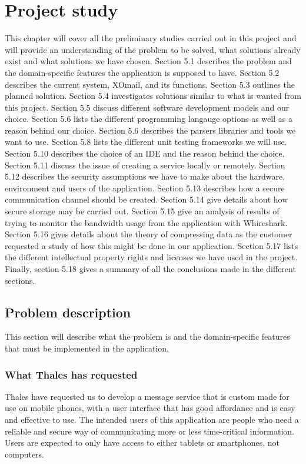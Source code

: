 \chapter{Project study}

This chapter will cover all the preliminary studies carried out in this project and will provide an understanding of the problem to be solved, what solutions already exist and what solutions we have chosen. Section 5.1 describes the problem and the domain-specific features the application is supposed to have. Section 5.2 describes the current system, XOmail, and its functions. Section 5.3 outlines the planned solution. Section 5.4 investigates solutions similar to what is wanted from this project. Section 5.5 discuss different software development models and our choice. Section 5.6 lists the different programming langauge options as well as a reason behind our choice. Section 5.6 describes the parsers libraries and tools we want to use. Section 5.8 lists the different unit testing frameworks we will use. Section 5.10 describes the choice of an IDE and the reason behind the choice. Section 5.11 discuss the issue of creating a service locally or remotely. Section 5.12 describes the security assumptions we have to make about the hardware, environment and users of the application. Section 5.13 describes how a secure communication channel should be created. Section 5.14 give details about how secure storage may be carried out. Section 5.15 give an analysis of results of trying to monitor the bandwidth usage from the application with Whireshark. Section 5.16 gives details about the theory of compressing data as the customer requested a study of how this might be done in our application. Section 5.17 lists the different intellectual property rights and licenses we have used in the project. Finally, section 5.18 gives a summary of all the conclusions made in the different sections.

\section{Problem description}

This section will describe what the problem is and the domain-specific features that must be implemented in the application.

\subsection{What Thales has requested}
Thales have requested us to develop a message service that is custom made for use on mobile phones, with a user interface that has good affordance and is easy and effective to use.
\newline
\newline
The intended users of this application are people who need a reliable and secure way of communicating more or less time-critical information. Users are expected to only have access to either tablets or smartphones, not computers.

